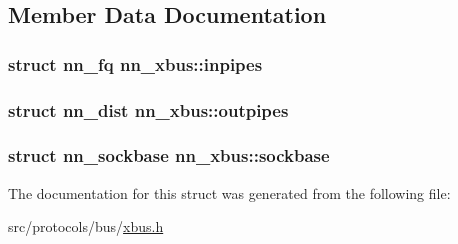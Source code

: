 \subsection{Member Data Documentation}
\subsubsection[{inpipes}]{\setlength{\rightskip}{0pt plus 5cm}struct {\bf nn\+\_\+fq} nn\+\_\+xbus\+::inpipes}\hypertarget{structnn__xbus_a8360c87f314c042ec1e91d4c4c57c8d6}{}\label{structnn__xbus_a8360c87f314c042ec1e91d4c4c57c8d6}
\subsubsection[{outpipes}]{\setlength{\rightskip}{0pt plus 5cm}struct {\bf nn\+\_\+dist} nn\+\_\+xbus\+::outpipes}\hypertarget{structnn__xbus_a48445675e3b8c5a6f8c71e1815b30505}{}\label{structnn__xbus_a48445675e3b8c5a6f8c71e1815b30505}
\subsubsection[{sockbase}]{\setlength{\rightskip}{0pt plus 5cm}struct {\bf nn\+\_\+sockbase} nn\+\_\+xbus\+::sockbase}\hypertarget{structnn__xbus_a68b2737065ec78b74c38087a7ce55bc4}{}\label{structnn__xbus_a68b2737065ec78b74c38087a7ce55bc4}


The documentation for this struct was generated from the following file\+:\begin{DoxyCompactItemize}
\item 
src/protocols/bus/\hyperlink{xbus_8h}{xbus.\+h}\end{DoxyCompactItemize}

